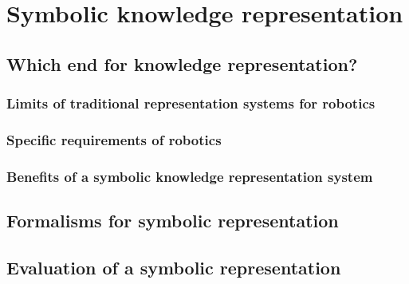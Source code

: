 \chapter{Symbolic knowledge representation}

\section{Which end for knowledge representation?}
\label{sect|krs-purpose}

\subsection{Limits of traditional representation systems for robotics}
\label{subssect|limits}

\subsection{Specific requirements of robotics}
\label{subssect|robotics-specifics}

\subsection{Benefits of a symbolic knowledge representation system}
\label{subssect|krs-benefits}


\section{Formalisms for symbolic representation}
\label{sect|formalisms}

\section{Evaluation of a symbolic representation }
\label{sect|krs-evaluation}

